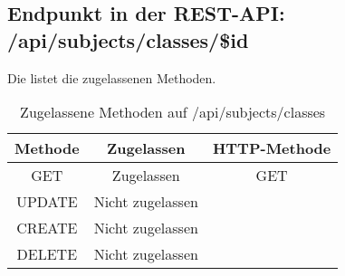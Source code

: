 \subsection{Endpunkt in der REST-API: /api/subjects/classes/\$id}
Die  listet die zugelassenen Methoden. 

\begin{table}[!htbp]
	\begin{tabular}{|c|c|c|}
		\hline
			\textbf{Methode} & \textbf{Zugelassen} & \textbf{HTTP-Methode} \\ \hline
			GET & Zugelassen & GET \\ \hline
			UPDATE & Nicht zugelassen & \\ \hline 
			CREATE & Nicht zugelassen & \\ \hline 
			DELETE & Nicht zugelassen & \\ \hline
	\end{tabular}

		\caption{Zugelassene Methoden auf /api/subjects/classes}
		\label{tab:end:rest:api:subjects:classes:meth}
\end{table}